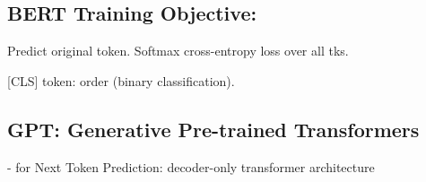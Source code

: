 





\subsection*{BERT Training Objective:}
Predict original token. Softmax cross-entropy loss over all tks.

[CLS] token: order (binary classification).






\subsection*{GPT: Generative Pre-trained Transformers}
- for Next Token Prediction: decoder-only transformer architecture


